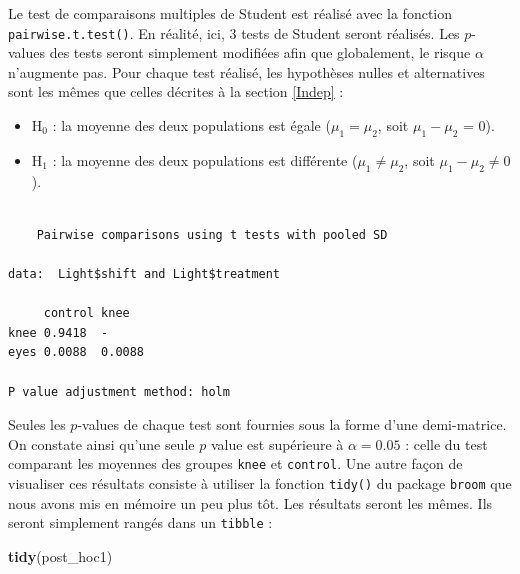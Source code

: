 \documentclass[a4paperpaper,]{article}
\newenvironment{Shaded}{\begin{snugshade}}{\end{snugshade}}
\newcommand{\CommentTok}[1]{\textcolor[rgb]{0.54,0.53,0.53}{#1}}
\newcommand{\KeywordTok}[1]{\textcolor[rgb]{0.12,0.11,0.11}{\textbf{#1}}}
\newcommand{\NormalTok}[1]{\textcolor[rgb]{0.12,0.11,0.11}{#1}}
\newcommand{\OperatorTok}[1]{\textcolor[rgb]{0.12,0.11,0.11}{#1}}
\newcommand{\StringTok}[1]{\textcolor[rgb]{0.75,0.01,0.01}{#1}}
\providecommand{\tightlist}{%
  \setlength{\itemsep}{0pt}\setlength{\parskip}{0pt}}
\begin{document}
Le test de comparaisons multiples de Student est réalisé avec la fonction \texttt{pairwise.t.test()}. En réalité, ici, 3 tests de Student seront réalisés. Les \(p\)-values des tests seront simplement modifiées afin que globalement, le risque \(\alpha\) n'augmente pas. Pour chaque test réalisé, les hypothèses nulles et alternatives sont les mêmes que celles décrites à la section \ref{Indep} :

\begin{itemize}
\tightlist
\item
  H\(_0\) : la moyenne des deux populations est égale (\(\mu_1 = \mu_2\), soit \(\mu_1 - \mu_2\) = 0).
\item
  H\(_1\) : la moyenne des deux populations est différente (\(\mu_1 \neq \mu_2\), soit \(\mu_1 - \mu_2 \neq 0\)).
\end{itemize}

\begin{Shaded}
\end{Shaded}

\begin{verbatim}

    Pairwise comparisons using t tests with pooled SD 

data:  Light$shift and Light$treatment 

     control knee  
knee 0.9418  -     
eyes 0.0088  0.0088

P value adjustment method: holm 
\end{verbatim}

Seules les \(p\)-values de chaque test sont fournies sous la forme d'une demi-matrice. On constate ainsi qu'une seule \(p\) value est supérieure à \(\alpha = 0.05\) : celle du test comparant les moyennes des groupes \texttt{knee} et \texttt{control}. Une autre façon de visualiser ces résultats consiste à utiliser la fonction \texttt{tidy()} du package \texttt{broom} que nous avons mis en mémoire un peu plus tôt. Les résultats seront les mêmes. Ils seront simplement rangés dans un \texttt{tibble} :

\begin{Shaded}
\begin{Highlighting}[]
\KeywordTok{tidy}\NormalTok{(post_hoc1)}
\end{Highlighting}
\end{Shaded}
\end{document}
